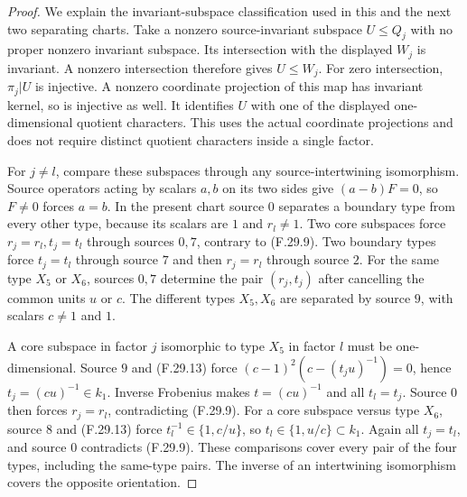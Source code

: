 \begin{proof}
We explain the invariant-subspace classification
used in this and the next two separating charts.
Take a nonzero source-invariant subspace
$U\leq Q_j$ with no proper nonzero invariant
subspace. Its intersection with the displayed
$W_j$ is invariant. A nonzero intersection
therefore gives $U\leq W_j$.
For zero intersection, $\pi_j|U$ is injective.
A nonzero coordinate projection of this map
has invariant kernel, so is injective as well.
It identifies $U$ with one of the displayed
one-dimensional quotient characters. This
uses the actual coordinate projections and
does not require distinct quotient characters
inside a single factor.

For $j\ne l$, compare these subspaces through
any source-intertwining isomorphism. Source
operators acting by scalars $a,b$ on its two
sides give $(a-b)F=0$, so $F\ne0$ forces $a=b$.
In the present chart source $0$ separates a
boundary type from every other type, because
its scalars are $1$ and $r_l\ne1$.
Two core subspaces force $r_j=r_l,t_j=t_l$
through sources $0,7$, contrary to (F.29.9).
Two boundary types force $t_j=t_l$ through
source $7$ and then $r_j=r_l$ through source $2$.
For the same type $X_5$ or $X_6$, sources $0,7$
determine the pair $(r_j,t_j)$ after cancelling
the common units $u$ or $c$.
The different types $X_5,X_6$ are separated
by source $9$, with scalars $c\ne1$ and $1$.

A core subspace in factor $j$ isomorphic to
type $X_5$ in factor $l$ must be one-dimensional.
Source $9$ and (F.29.13) force
$(c-1)^2(c-(t_ju)^{-1})=0$, hence
$t_j=(cu)^{-1}\in k_1$.
Inverse Frobenius makes $t=(cu)^{-1}$ and all
$t_l=t_j$. Source $0$ then forces $r_j=r_l$,
contradicting (F.29.9).
For a core subspace versus type $X_6$, source
$8$ and (F.29.13) force
$t_l^{-1}\in\{1,c/u\}$, so
$t_l\in\{1,u/c\}\subset k_1$.
Again all $t_j=t_l$, and source $0$ contradicts
(F.29.9). These comparisons cover every pair
of the four types, including the same-type
pairs. The inverse of an intertwining
isomorphism covers the opposite orientation.


\end{proof}
